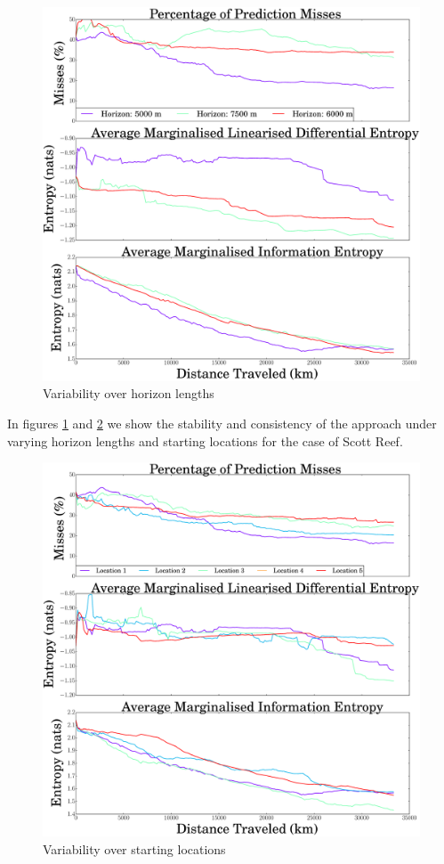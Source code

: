 \documentclass{article}
\begin{document}
		\begin{figure}[!htbp]
		\centering
			\includegraphics[width = \linewidth]{Figures/compare_horizons.eps}
		\caption{Variability over horizon lengths}
		\label{Figure:Results:CompareHorizons}
		\end{figure}
	
		In figures \ref{Figure:Results:CompareHorizons} and \ref{Figure:Results:CompareLocations} we show the stability and consistency of the approach under varying horizon lengths and starting locations for the case of Scott Reef. 
		
		\begin{figure}[!htbp]
		\centering
			\includegraphics[width = \linewidth]{Figures/compare_locations.eps}
		\caption{Variability over starting locations}
		\label{Figure:Results:CompareLocations}
		\end{figure}
		
\end{document}
